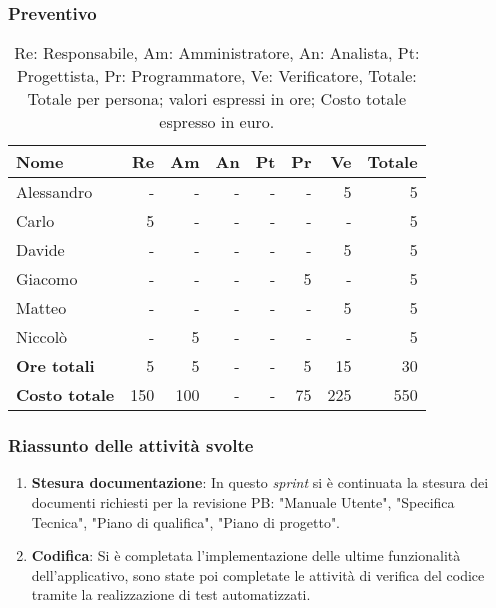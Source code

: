 \subsubsection{Preventivo}

\begin{table}[H]
	\centering
	\begin{tabular}{l|r|r|r|r|r|r|r}
		\textbf{Nome}         & \textbf{Re} & \textbf{Am} & \textbf{An} & \textbf{Pt} & \textbf{Pr} & \textbf{Ve} & \textbf{Totale} \\
		\hline
		Alessandro            & -           & -           & -           & -           & -           & 5           & 5               \\
		Carlo                 & 5           & -           & -           & -           & -           & -           & 5               \\
		Davide                & -           & -           & -           & -           & -           & 5           & 5               \\
		Giacomo               & -           & -           & -           & -           & 5           & -           & 5              \\
		Matteo                & -           & -           & -           & -           & -           & 5           & 5               \\
		Niccolò               & -           & 5           & -           & -           & -           & -           & 5               \\
		\hline
		\textbf{Ore totali}   & 5           & 5           & -           & -           & 5           & 15          & 30              \\
		\textbf{Costo totale} & 150         & 100         & -           & -           & 75          & 225         & 550
	\end{tabular}
	\caption{Re: Responsabile, Am: Amministratore, An: Analista, Pt: Progettista,
		Pr: Programmatore, Ve: Verificatore, Totale: Totale per persona; valori espressi in ore; Costo totale espresso in euro.}
\end{table}

\subsubsection{Riassunto delle attività svolte}

\begin{enumerate}
	\item \textbf{Stesura documentazione}: In questo \textit{sprint} si è continuata la stesura dei documenti richiesti per la revisione PB: "Manuale Utente", "Specifica Tecnica", "Piano di qualifica", "Piano di progetto".

	\item \textbf{Codifica}: Si è completata l'implementazione delle ultime funzionalità dell'applicativo, sono state poi completate le attività di verifica del codice tramite la realizzazione di test automatizzati.
\end{enumerate}

